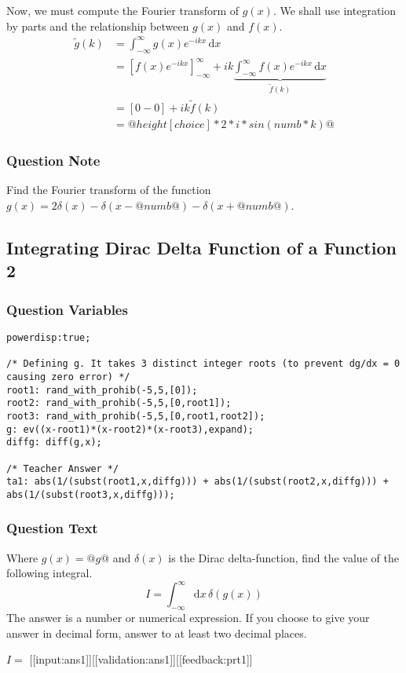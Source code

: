 \documentclass[a4paper,10pt]{article}
\begin{document}
Now, we must compute the Fourier transform of \(g(x)\). We shall use integration by parts and the relationship between \(g(x)\) and \(f(x)\). \begin{align*} \tilde{g}(k) &= \int_{-\infty}^{\infty} g(x)e^{-ikx} \, \text{d}x \\ &= \left[ f(x)e^{-ikx} \right]_{-\infty}^{\infty} + ik \underbrace{\int_{-\infty}^{\infty} f(x)e^{-ikx} \, \text{d}x}_{\tilde{f}(k)} \\ &= \left[0 - 0 \right] + ik\tilde{f}(k) \\ &= @height[choice]*2*i*sin(numb*k)@ \end{align*}
\subsubsection{Question Note}
Find the Fourier transform of the function \(g(x) = 2\delta(x)-\delta(x-@numb@)-\delta(x+@numb@)\).

\subsection{Integrating Dirac Delta Function of a Function 2}
\subsubsection{Question Variables}
\begin{lstlisting}
powerdisp:true;

/* Defining g. It takes 3 distinct integer roots (to prevent dg/dx = 0  causing zero error) */
root1: rand_with_prohib(-5,5,[0]);
root2: rand_with_prohib(-5,5,[0,root1]);
root3: rand_with_prohib(-5,5,[0,root1,root2]);
g: ev((x-root1)*(x-root2)*(x-root3),expand);
diffg: diff(g,x);

/* Teacher Answer */
ta1: abs(1/(subst(root1,x,diffg))) + abs(1/(subst(root2,x,diffg))) + abs(1/(subst(root3,x,diffg)));
\end{lstlisting}
\subsubsection{Question Text}
Where \(g(x)=@g@\) and \(\delta(x)\) is the Dirac delta-function, find the value of the following integral. \[ I = \int_{-\infty}^{\infty} \text{d}x \, \delta(g(x)) \]The answer is a number or numerical expression. If you choose to give your answer in decimal form, answer to at least two decimal places.

\(I = \) [[input:ans1]][[validation:ans1]][[feedback:prt1]]
\end{document}

